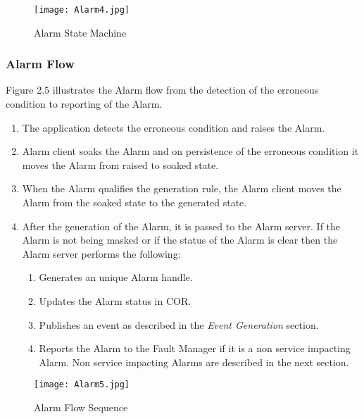 \begin{figure}
\begin{center}
\texttt{[image: Alarm4.jpg]}
\end{center}
\caption{Alarm State Machine}
\end{figure}
\begin{flushleft}


\newpage
\subsubsection{Alarm Flow}
Figure 2.5 illustrates the Alarm flow from the detection of the erroneous condition to reporting of the Alarm.
\begin{enumerate}
\item
The application detects the erroneous condition and raises the Alarm.
\item
Alarm client soaks the Alarm and on persistence of the erroneous condition it moves the Alarm from raised to soaked state.
\item
When the Alarm qualifies the generation rule, the Alarm client moves the Alarm from the soaked state to the generated state.
\item
After the generation of the Alarm, it is passed to the Alarm server. If the Alarm is not being masked or if the status of the Alarm is clear then
the Alarm server performs the following:
\begin{enumerate}
\item
	Generates an unique Alarm handle.
	\item
	Updates the Alarm status in COR.
	\item
	Publishes an event as described in the \textit{Event Generation} section. 
	      \item
	Reports the Alarm to the Fault Manager if it is a non service impacting 
                Alarm. Non service impacting Alarms are described in the next section.
             	\end{enumerate}
   
	\end{enumerate}



\end{flushleft}
\begin{figure}
\begin{center}
\texttt{[image: Alarm5.jpg]}
\end{center}
\caption{Alarm Flow Sequence}
\end{figure}
